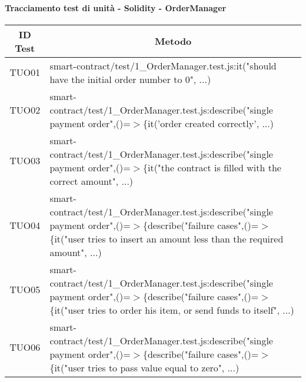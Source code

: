 \paragraph{Tracciamento test di unità - Solidity - OrderManager}\label{paragraph:tracciamento_TUO}

\begin{table}[H]
  \centering
  \renewcommand{\arraystretch}{1.8}
  \begin{tabular}{c|p{15cm}}
    \rowcolor[HTML]{125E28}
    \color[HTML]{FFFFFF}\textbf{ID Test}
          & \multicolumn{1}{c}{\color[HTML]{FFFFFF}\textbf{Metodo}}                                                                                                                                                   \\
    \hline
    TUO01 & smart-contract/test/1\_OrderManager.test.js:it("should have the initial order number to 0", ...)                                                                                                          \\
    TUO02 & smart-contract/test/1\_OrderManager.test.js:describe("single payment order",\newline()=$>$\{it('order created correctly', ...)                                                                            \\
    TUO03 & smart-contract/test/1\_OrderManager.test.js:describe("single payment order",\newline()=$>$\{it("the contract is filled with the correct amount", ...)                                                     \\
    TUO04 & smart-contract/test/1\_OrderManager.test.js:describe("single payment order",\newline()=$>$\{describe("failure cases",()=$>$\{it("user tries to insert an amount less than the required amount", ...)      \\
    TUO05 & smart-contract/test/1\_OrderManager.test.js:describe("single payment order",\newline()=$>$\{describe("failure cases",()=$>$\{it("user tries to order his item, or send funds to itself", ...)             \\
    TUO06 & smart-contract/test/1\_OrderManager.test.js:describe("single payment order",\newline()=$>$\{describe("failure cases",()=$>$\{it("user tries to pass value equal to zero", ...)                            \\

\end{tabular}
\end{table}
